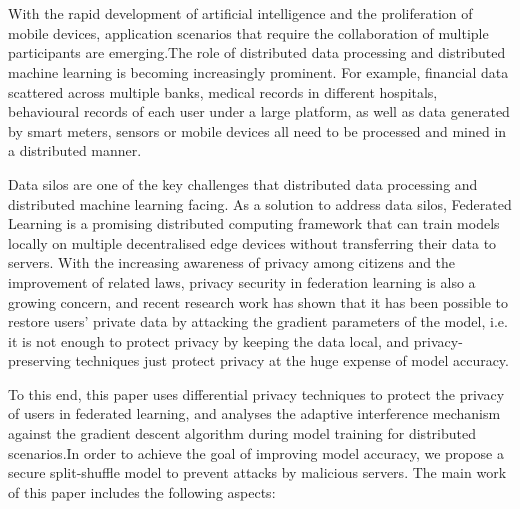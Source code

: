 \newpage
\vspace{-1cm}
\chapter*{}

With the rapid development of artificial intelligence and the proliferation of mobile devices, application scenarios that require the collaboration of multiple participants are emerging.The role of distributed data processing and distributed machine learning is becoming increasingly prominent. For example, financial data scattered across multiple banks, medical records in different hospitals, behavioural records of each user under a large platform, as well as data generated by smart meters, sensors or mobile devices all need to be processed and mined in a distributed manner. 

Data silos are one of the key challenges that distributed data processing and distributed machine learning facing. As a solution to address data silos, Federated Learning is a promising distributed computing framework that can train models locally on multiple decentralised edge devices without transferring their data to servers. With the increasing awareness of privacy among citizens and the improvement of related laws, privacy security in federation learning is also a growing concern, and recent research work has shown that it has been possible to restore users' private data by attacking the gradient parameters of the model, i.e. it is not enough to protect privacy by keeping the data local, and privacy-preserving techniques just protect privacy at the huge expense of model accuracy. 

To this end, this paper uses differential privacy techniques to protect the privacy of users in federated learning, and analyses the adaptive interference mechanism against the gradient descent algorithm during model training for distributed scenarios.In order to achieve the goal of improving model accuracy, we propose a secure split-shuffle model to prevent attacks by malicious servers. The main work of this paper includes the following aspects:

